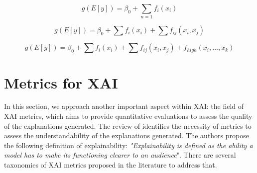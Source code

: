 \begin{equation}\label{eq:ch2-sota-GAM}
g(E[y]) = \beta_0 + \sum_{n=1} f_{i}(x_{i})
\end{equation}

\begin{equation}\label{eq:ch2-sota-EBM-pairwise}
g(E[y]) = \beta_0 + \sum f_{i}(x_{i}) + \sum f_{ij}(x_{i}, x_{j})
\end{equation}

\begin{equation}\label{eq:ch2-sota-GA2M+}
g(E[y]) = \beta_0 + \sum f_{i}(x_{i}) + \sum f_{ij}(x_{i}, x_{j}) + f_{high}(x_{i},..., x_{k})
\end{equation}

\section{Metrics for XAI}\label{sec:ch2-metrics-xai}
In this section, we approach another important aspect within XAI: the field of XAI metrics, which aims to provide quantitative evaluations to assess the quality of the explanations generated. The review of \parencite{arrieta2020explainable} identifies the necessity of metrics to assess the understandability of the explanations generated. The authors propose the following definition of explainability: \textit{"Explainability is defined as the ability a model has to make its functioning clearer to an audience}". There are several taxonomies of XAI metrics proposed in the literature to address that. 

